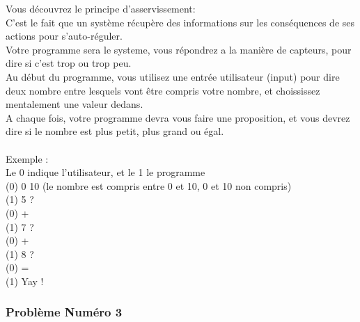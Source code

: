 \documentclass[12pt]{article}
\begin{document}
Vous découvrez le principe d'asservissement:\\
C'est le fait que un système récupère des informations sur les conséquences de ses actions pour s'auto-réguler.\\
Votre programme sera le systeme, vous répondrez a la manière de capteurs, pour dire si c'est trop ou trop peu.\\
Au début du programme, vous utilisez une entrée utilisateur (input) pour dire deux nombre entre lesquels vont être compris votre nombre, et choississez mentalement une valeur dedans.\\
A chaque fois, votre programme devra vous faire une proposition, et vous devrez dire si le nombre est plus petit, plus grand ou égal.
\\\\
Exemple :\\
Le 0 indique l'utilisateur, et le 1 le programme\\
(0) 0 10 (le nombre est compris entre 0 et 10, 0 et 10 non compris)\\
(1) 5 ?\\
(0) +\\
(1) 7 ?\\
(0) +\\
(1) 8 ?\\
(0) =\\
(1) Yay !

\subsubsection{Problème Numéro 3}
\end{document}
